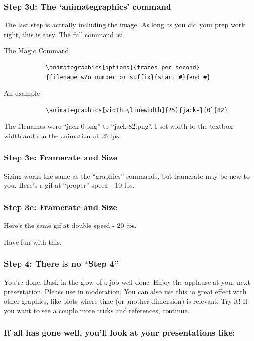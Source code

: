 \documentclass{beamer}
\begin{document}
\begin{frame}[fragile]
	\frametitle{Step 3d: The `animategraphics' command}
	The last step is actually including the image. As long as you did your prep work right, this is easy. The full command is:
		\begin{block}{The Magic Command}
			\begin{verbatim}
			\animategraphics[options]{frames per second}
			{filename w/o number or suffix}{start #}{end #}
			\end{verbatim}
		\end{block}
		\begin{block}{An example}
			\begin{verbatim}
			\animategraphics[width=\linewidth]{25}{jack-}{0}{82}
			\end{verbatim}
			The filenames were ``jack-0.png'' to ``jack-82.png''. I set width to the textbox width and ran the animation at 25 fps.
		\end{block}
\end{frame}

\begin{frame}
	\frametitle{Step 3e: Framerate and Size}
	Sizing works the same as the ``graphics'' commands, but framerate may be new to you. Here's a gif at ``proper'' speed - 10 fps.
		\begin{center}
		\end{center}
\end{frame}

\begin{frame}
	\frametitle{Step 3e: Framerate and Size}
	Here's the same gif at double speed - 20 fps.
		\begin{center}
		\end{center}
	Have fun with this.
\end{frame}

\begin{frame}
	\frametitle{Step 4: There is no ``Step 4''}
	You're done. Bask in the glow of a job well done. Enjoy the applause at your next presentation. Please use in moderation. You can also use this to great effect with other graphics, like plots where time (or another dimension) is relevant. Try it! If you want to see a couple more tricks and references, continue.
\end{frame}

\begin{frame}
	\frametitle{If all has gone well, you'll look at your presentations like:}
	\begin{center}
	\end{center}
\end{frame}
\end{document}
